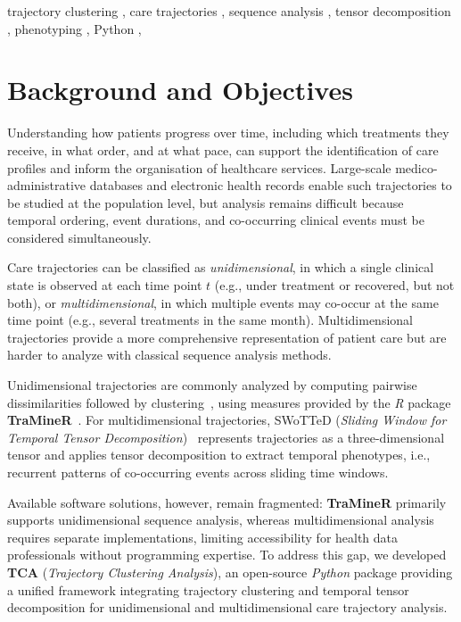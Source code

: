 \documentclass[a4paper]{cas-sc}
\newcommand{\proglang}[1]{\textit{#1}}
\newcommand{\pkg}[1]{\textbf{#1}}
\begin{document}
\begin{keywords}
  trajectory clustering \sep
  care trajectories \sep
  sequence analysis \sep
  tensor decomposition \sep
  phenotyping \sep
  Python \sep
\end{keywords}

\maketitle

\section{Background and Objectives}\label{sec:background}

Understanding how patients progress over time, including which treatments they receive, in what order, and at what pace, can support the identification of care profiles and inform the organisation of healthcare services.
Large-scale medico-administrative databases and electronic health records enable such trajectories to be studied at the population level, but analysis remains difficult because temporal ordering, event durations, and co-occurring clinical events must be considered simultaneously.
 
Care trajectories can be classified as \emph{unidimensional}, in which a single clinical state is observed at each time point $t$ (e.g., under treatment or recovered, but not both), or \emph{multidimensional}, in which multiple events may co-occur at the same time point (e.g., several treatments in the same month). 
Multidimensional trajectories provide a more comprehensive representation of patient care but are harder to analyze with classical sequence analysis methods.
 
Unidimensional trajectories are commonly analyzed by computing pairwise dissimilarities followed by clustering~\cite{denteuling2026clustering,pacca2025sequence}, using measures provided by the \proglang{R} package \pkg{TraMineR}~\cite{traminer}. 
For multidimensional trajectories, SWoTTeD (\emph{Sliding Window for Temporal Tensor Decomposition})~\cite{sebia2024swotted} represents trajectories as a three-dimensional tensor and applies tensor decomposition to extract temporal phenotypes, i.e., recurrent patterns of co-occurring events across sliding time windows.
 
Available software solutions, however, remain fragmented: \pkg{TraMineR} primarily supports unidimensional sequence analysis, whereas multidimensional analysis requires separate implementations, limiting accessibility for health data professionals without programming expertise.
To address this gap, we developed \pkg{TCA} (\emph{Trajectory Clustering Analysis}), an open-source \proglang{Python} package providing a unified framework integrating trajectory clustering and temporal tensor decomposition for unidimensional and multidimensional care trajectory analysis.
\end{document}
